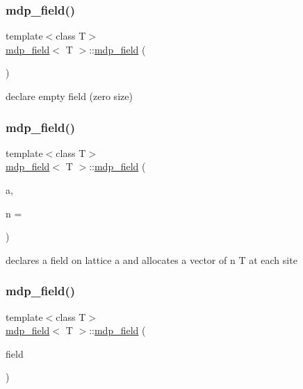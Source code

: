 \subsubsection{\texorpdfstring{mdp\+\_\+field()}{mdp\_field()}\hspace{0.1cm}{\footnotesize\ttfamily [1/3]}}
{\footnotesize\ttfamily template$<$class T$>$ \\
\hyperlink{classmdp__field}{mdp\+\_\+field}$<$ T $>$\+::\hyperlink{classmdp__field}{mdp\+\_\+field} (\begin{DoxyParamCaption}{ }\end{DoxyParamCaption})\hspace{0.3cm}{\ttfamily [inline]}}



declare empty field (zero size) 

\mbox{\label{classmdp__field_aaae273c82d9b0931e31f7265d5ca2652}} 
\subsubsection{\texorpdfstring{mdp\+\_\+field()}{mdp\_field()}\hspace{0.1cm}{\footnotesize\ttfamily [2/3]}}
{\footnotesize\ttfamily template$<$class T$>$ \\
\hyperlink{classmdp__field}{mdp\+\_\+field}$<$ T $>$\+::\hyperlink{classmdp__field}{mdp\+\_\+field} (\begin{DoxyParamCaption}\item[{\hyperlink{classmdp__lattice}{mdp\+\_\+lattice} \&}]{a,  }\item[{int}]{n = {} }\end{DoxyParamCaption})\hspace{0.3cm}{\ttfamily [inline]}}



declares a field on lattice a and allocates a vector of n T at each site 

\mbox{\label{classmdp__field_a0f143d8cceb191d24cf72025091a03a9}} 
\subsubsection{\texorpdfstring{mdp\+\_\+field()}{mdp\_field()}\hspace{0.1cm}{\footnotesize\ttfamily [3/3]}}
{\footnotesize\ttfamily template$<$class T$>$ \\
\hyperlink{classmdp__field}{mdp\+\_\+field}$<$ T $>$\+::\hyperlink{classmdp__field}{mdp\+\_\+field} (\begin{DoxyParamCaption}\item[{const \hyperlink{classmdp__field}{mdp\+\_\+field}$<$ T $>$ \&}]{field }\end{DoxyParamCaption})\hspace{0.3cm}{\ttfamily [inline]}}

